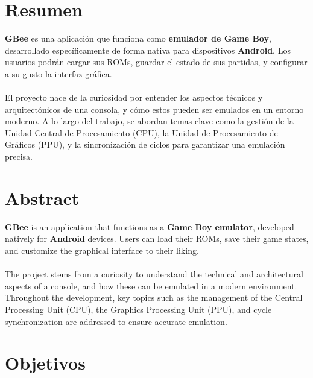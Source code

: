 
\chapter{Resumen}
\label{resumen}
\textbf{GBee} es una aplicación que funciona como \textbf{emulador de Game Boy}, desarrollado específicamente de forma nativa para dispositivos \textbf{Android}. Los usuarios podrán cargar sus ROMs, guardar el estado de sus partidas, y configurar a su gusto la interfaz gráfica.
\\\\
El proyecto nace de la curiosidad por entender los aspectos técnicos y arquitectónicos de una consola, y cómo estos pueden ser emulados en un entorno moderno. A lo largo del trabajo, se abordan temas clave como la gestión de la Unidad Central de Procesamiento (CPU), la Unidad de Procesamiento de Gráficos (PPU), y la sincronización de ciclos para garantizar una emulación precisa.
{\let\clearpage\relax\chapter*{Abstract}}

\textbf{GBee} is an application that functions as a \textbf{Game Boy emulator}, developed natively for \textbf{Android} devices. Users can load their ROMs, save their game states, and customize the graphical interface to their liking.
\\\\
The project stems from a curiosity to understand the technical and architectural aspects of a console, and how these can be emulated in a modern environment. Throughout the development, key topics such as the management of the Central Processing Unit (CPU), the Graphics Processing Unit (PPU), and cycle synchronization are addressed to ensure accurate emulation.
\cleardoublepage

\chapter{Objetivos}
\label{objetivos}

